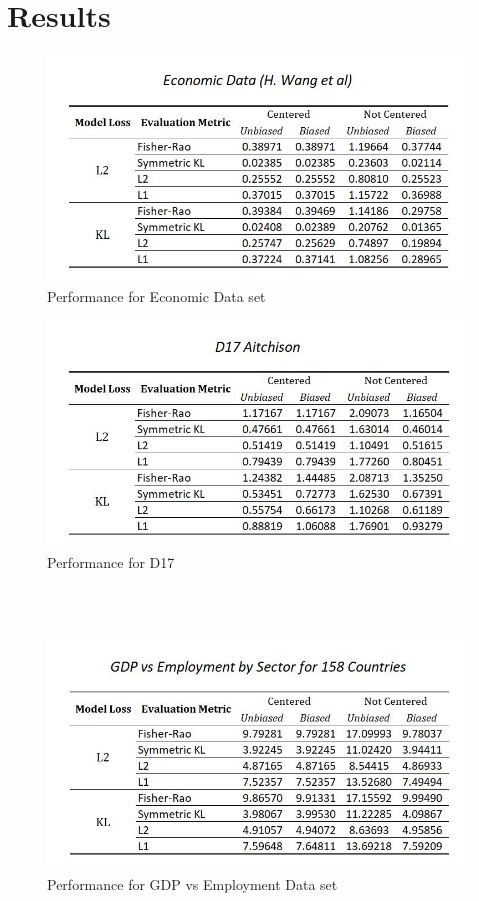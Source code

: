 \documentclass[BSc]{usydthesis}
\numberwithin{equation}{chapter}
\theoremstyle{remark}
\begin{document}
\section{Results}
\begin{figure}[hbt!]
 \centering
 \includegraphics[scale=0.9,keepaspectratio=true]{table1.JPG}
 \caption{Performance for Economic Data set}
\end{figure}
\begin{figure}[hbt!]
 \centering
 \includegraphics[scale=0.9,keepaspectratio=true]{table2.JPG}
 \caption{Performance for D17}
\end{figure}
\newpage
\ \\
\
\begin{figure}[hbt!]
 \centering
 \includegraphics[scale=0.9,keepaspectratio=true]{table3.JPG}
 \caption{Performance for GDP vs Employment Data set}
\end{figure}
\end{document}
